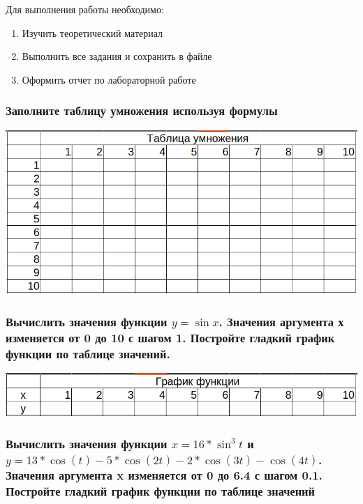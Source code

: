 Для выполнения работы необходимо:
\begin{enumerate}
  \item Изучить теоретический материал
  \item Выполнить все задания и сохранить в файле
  \item Оформить отчет по лабораторной работе
\end{enumerate}

\subsubsection{Заполните таблицу умножения используя формулы}

\includegraphics[width=\textwidth]{t1.png}

\subsubsection{Вычислить значения функции $y=\sin x$. Значения аргумента х изменяется от 0 до 10 с шагом 1. Постройте гладкий  график функции по таблице значений.}

\includegraphics[width=\textwidth]{t2.png}

\subsubsection{Вычислить значения функции $x=16 * \sin^{3}t$ и $y = 13 * \cos(t) - 5 * \cos(2t) - 2 * \cos(3t) - \cos(4t)$. Значения аргумента x изменяется  от 0 до 6.4 с шагом 0.1. Постройте гладкий график функции по таблице значений}

